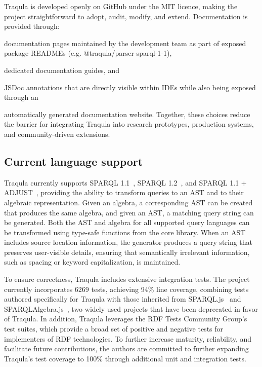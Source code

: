\documentclass[runningheads]{llncs}
\begin{document}
    Traqula is developed openly on GitHub under the MIT licence, making the project straightforward to adopt, audit, modify, and extend.
    Documentation is provided through:
    \begin{enumerate*}[label=\arabic*.]
    \item documentation pages maintained by the development team as part of exposed package READMEs (e.g. @traqula/parser-sparql-1-1),
    \item dedicated documentation guides, and
    \item JSDoc annotations that are directly visible within IDEs while also being exposed through an
    \end{enumerate*}
    automatically generated documentation website.
    Together, these choices reduce the barrier for integrating Traqula into research prototypes, production systems, and community-driven extensions.

    \subsection{Current language support}

    Traqula currently supports SPARQL 1.1~\cite{spec:sparqllang}, SPARQL 1.2~\cite{sparql-1-2}, and SPARQL 1.1 + ADJUST~\cite{sparql-adjust},
    providing the ability to transform queries to an AST and to their algebraic representation.
    Given an algebra, a corresponding AST can be created that produces the same algebra, and given an AST, a matching query string can be generated.
    Both the AST and algebra for all supported query languages can be transformed using type-safe functions from the core library.
    When an AST includes source location information, the generator produces a query string that preserves user-visible details,
    ensuring that semantically irrelevant information, such as spacing or keyword capitalization, is maintained.

    To ensure correctness, Traqula includes extensive integration tests.
    The project currently incorporates 6269 tests, achieving 94\% line coverage,
    combining tests authored specifically for Traqula with those inherited from SPARQL.js~\cite{sparqljs} and SPARQLAlgebra.js~\cite{sparqlalgebrajs},
    two widely used projects that have been deprecated in favor of Traqula.
    In addition, Traqula leverages the RDF Tests Community Group's test suites,
    which provide a broad set of positive and negative tests for implementers of RDF technologies.
    To further increase maturity, reliability, and facilitate future contributions,
    the authors are committed to further expanding Traqula's test coverage to 100\% through additional unit and integration tests.
\end{document}
